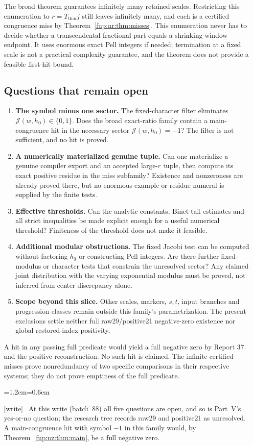 \documentclass[11pt,letterpaper]{article}
\theoremstyle{definition}\newtheorem{definition}[theorem]{Definition}
\theoremstyle{remark}\newtheorem{remark}[theorem]{Remark}
\newcommand{\wtag}{\textup{[write]}}
\newenvironment{writenote}{\par\smallskip\begin{list}{}{\leftmargin=1.2em\rightmargin=0.6em}\item[]\small\wtag\ }{\end{list}\smallskip}
\begin{document}
The broad theorem guarantees infinitely many retained scales. Restricting this enumeration to $r=T_{\mathrm{thin}}j$ still leaves infinitely many, and each is a certified congruence miss by Theorem~\ref{fup:nr:thm:misses}. This enumeration never has to decide whether a transcendental fractional part equals a shrinking-window endpoint. It uses enormous exact Pell integers if needed; termination at a fixed scale is not a practical complexity guarantee, and the theorem does not provide a feasible first-hit bound.

\subsection{Questions that remain open}
\begin{enumerate}
\item \textbf{The symbol minus one sector.} The fixed-character filter eliminates $\mathcal J(w,h_0)\in\{0,1\}$. Does the broad exact-ratio family contain a main-congruence hit in the necessary sector $\mathcal J(w,h_0)=-1$? The filter is not sufficient, and no hit is proved.
\item \textbf{A numerically materialized genuine tuple.} Can one materialize a genuine compiler export and an accepted large-$r$ tuple, then compute its exact positive residue in the miss subfamily? Existence and nonzeroness are already proved there, but no enormous example or residue numeral is supplied by the finite tests.
\item \textbf{Effective thresholds.} Can the analytic constants, Binet-tail estimates and all strict inequalities be made explicit enough for a useful numerical threshold? Finiteness of the threshold does not make it feasible.
\item \textbf{Additional modular obstructions.} The fixed Jacobi test can be computed without factoring $h_0$ or constructing Pell integers. Are there further fixed-modulus or character tests that constrain the unresolved sector? Any claimed joint distribution with the varying exponential modulus must be proved, not inferred from center discrepancy alone.
\item \textbf{Scope beyond this slice.} Other scales, markers, $s,t$, input branches and progression classes remain outside this family's parametrization. The present exclusions settle neither full raw29/positive21 negative-zero existence nor global restored-index positivity.
\end{enumerate}
A hit in any passing full predicate would yield a full negative zero by Report 37 and the positive reconstruction. No such hit is claimed. The infinite certified misses prove nonredundancy of two specific comparisons in their respective systems; they do not prove emptiness of the full predicate.
\begin{writenote}
At this write (batch~88) all five questions are open, and so is Part~V's yes-or-no question; the research tree records raw29 and positive21 as unresolved. A main-congruence hit with symbol $-1$ in this family would, by Theorem~\ref{fup:nz:thm:main}, be a full negative zero.
\end{writenote}
\end{document}
